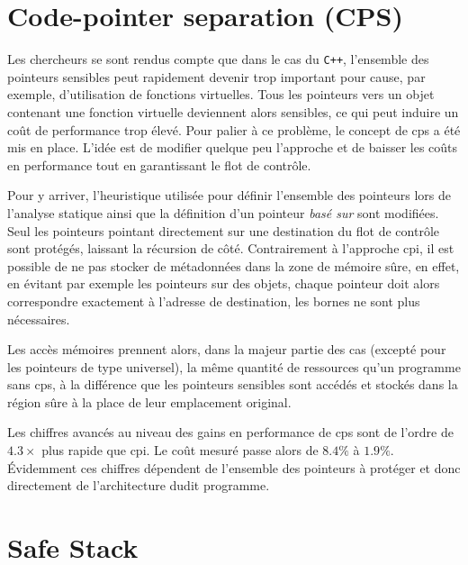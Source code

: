 \section{\og Code-pointer separation \fg (CPS)}

Les chercheurs se sont rendus compte que dans le cas du \texttt{C++}, l'ensemble des pointeurs sensibles peut rapidement devenir trop important pour cause, par exemple, d'utilisation de fonctions virtuelles. Tous les pointeurs vers un objet contenant une fonction virtuelle deviennent alors sensibles, ce qui peut induire un coût de performance trop élevé. Pour palier à ce problème, le concept de \og \gls{cps} \fg a été mis en place. L'idée est de modifier quelque peu l'approche et de baisser les coûts en performance tout en garantissant le flot de contrôle.

Pour y arriver, l'heuristique utilisée pour définir l'ensemble des pointeurs lors de l'analyse statique ainsi que la définition d'un pointeur \textit{basé sur} sont modifiées. Seul les pointeurs pointant directement sur une destination du flot de contrôle sont protégés, laissant la récursion de côté. Contrairement à l'approche \gls{cpi}, il est possible de ne pas stocker de métadonnées dans la zone de mémoire sûre, en effet, en évitant par exemple les pointeurs sur des objets, chaque pointeur doit alors correspondre exactement à l'adresse de destination, les bornes ne sont plus nécessaires.

Les accès mémoires prennent alors, dans la majeur partie des cas (excepté pour les pointeurs de type universel), la même quantité de ressources qu'un programme sans \gls{cps}, à la différence que les pointeurs sensibles sont accédés et stockés dans la région sûre à la place de leur emplacement original.

\newpage

Les chiffres avancés au niveau des gains en performance de \gls{cps} sont de l'ordre de $4.3\times$ plus rapide que \gls{cpi}. Le coût mesuré passe alors de $8.4\%$ à $1.9\%$. Évidemment ces chiffres dépendent de l'ensemble des pointeurs à protéger et donc directement de l'architecture dudit programme.


\section{\og Safe Stack \fg}
\label{section:safeStack}


